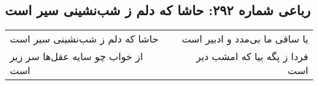 \begin{center}
\section*{رباعی شماره ۲۹۲: حاشا که دلم ز شب‌نشینی سیر است}
\label{sec:0292}
\begin{longtable}{l p{0.5cm} r}
حاشا که دلم ز شب‌نشینی سیر است
&&
یا ساقی ما بی‌مدد و ادبیر است
\\
از خواب چو سایه عقل‌ها سر زیر است
&&
فردا ز پگه بیا که امشب دیر است
\\
\end{longtable}
\end{center}

